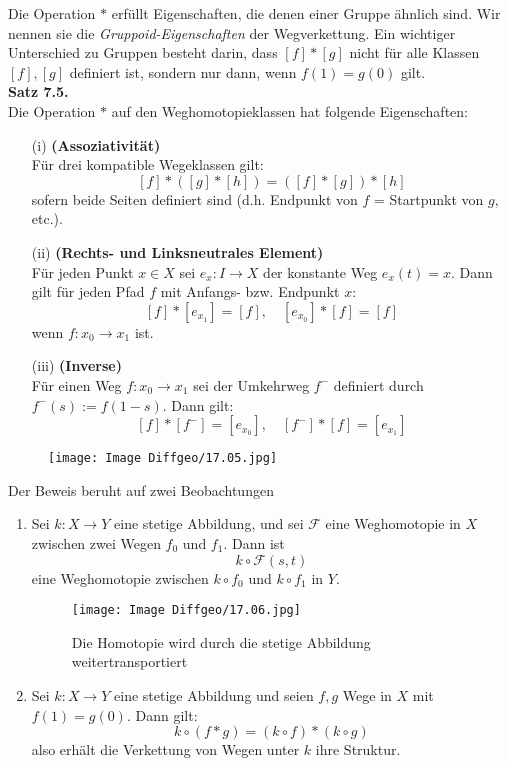 \documentclass[fleqn, 12pt, letterpaper]{article}
\begin{document}
Die Operation \( * \) erfüllt Eigenschaften, die denen einer Gruppe ähnlich sind. 
Wir nennen sie die \emph{Gruppoid-Eigenschaften} der Wegverkettung. Ein wichtiger Unterschied zu Gruppen besteht darin, dass \( [f] * [g] \) 
nicht für alle Klassen \( [f], [g] \) definiert ist, sondern nur dann, 
wenn \( f(1) = g(0) \) gilt.\\


\textbf{Satz 7.5.} \\
Die Operation \( * \) auf den Weghomotopieklassen hat folgende Eigenschaften:

\begin{enumerate}
  \item[(i)] \textbf{(Assoziativität)} \\
  Für drei kompatible Wegeklassen gilt:
  \[
  [f] * ([g] * [h]) = ([f] * [g]) * [h]
  \]
  sofern beide Seiten definiert sind (d.h. Endpunkt von \( f \) = Startpunkt von \( g \), etc.).

  \item[(ii)] \textbf{(Rechts- und Linksneutrales Element)} \\
  Für jeden Punkt \( x \in X \) sei \( e_x : I \to X \) der konstante Weg \( e_x(t) = x \). Dann gilt für jeden Pfad \( f \) mit Anfangs- bzw. Endpunkt \( x \):
  \[
  [f] * [e_{x_1}] = [f], \quad [e_{x_0}] * [f] = [f]
  \]
  wenn \( f : x_0 \to x_1 \) ist.

  \item[(iii)] \textbf{(Inverse)} \\
  Für einen Weg \( f : x_0 \to x_1 \) sei der Umkehrweg \( {f^{-}} \) definiert durch \( f^{-}(s) := f(1 - s) \). Dann gilt:
  \[
  [f] * [f^{-}] = [e_{x_0}], \quad [f^{-}] * [f] = [e_{x_1}]
  \]
\end{enumerate}
  \begin{figure}[H]
    \centering
    \texttt{[image: Image Diffgeo/17.05.jpg]}
 \end{figure}

{Der Beweis beruht auf zwei Beobachtungen}
\begin{enumerate}
  \item Sei \( k : X \to Y \) eine stetige Abbildung, und sei \( \mathcal{F} \) eine Weghomotopie in \( X \) zwischen zwei Wegen \( f_0 \) und \( f_1 \). Dann ist
  \[
  k \circ \mathcal{F}(s,t)
  \]
  eine Weghomotopie zwischen \( k \circ f_0 \) und \( k \circ f_1 \) in \( Y \).
  \begin{figure}[H]
    \centering
    \texttt{[image: Image Diffgeo/17.06.jpg]}
	\caption{Die Homotopie wird durch die stetige Abbildung weitertransportiert}
 \end{figure}

  \item Sei \( k : X \to Y \) eine stetige Abbildung und seien \( f, g \) Wege in \( X \) mit \( f(1) = g(0) \). Dann gilt:
  \[
  k \circ (f * g) = (k \circ f) * (k \circ g)
  \]
  also erhält die Verkettung von Wegen unter \( k \) ihre Struktur.

\end{enumerate}
\end{document}

